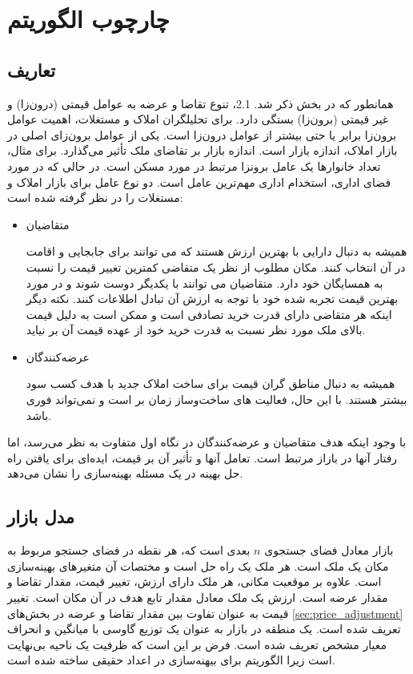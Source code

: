 \section{چارچوب الگوریتم }

\subsection{تعاریف}
همانطور که در بخش ذکر شد. 2.1، تنوع تقاضا و عرضه به عوامل قیمتی (درون‌زا) و غیر قیمتی (برون‌زا) بستگی دارد. برای تحلیلگران املاک و مستغلات، اهمیت عوامل برون‌زا  برابر یا حتی بیشتر از عوامل درون‌زا است.  یکی از عوامل برون‌زای اصلی در بازار املاک، اندازه بازار است. اندازه بازار بر تقاضای ملک تأثیر می‌گذارد. برای مثال، تعداد خانوارها یک عامل برونزا مرتبط در مورد مسکن است. در حالی که در مورد فضای اداری، استخدام اداری مهم‌ترین عامل است. دو نوع عامل برای بازار املاک و مستغلات را در نظر گرفته شده است:
\begin{itemize}
	\item متقاضیان
	
	 همیشه به دنبال دارایی با بهترین ارزش هستند که می توانند برای جابجایی و اقامت در آن انتخاب کنند. مکان مطلوب از نظر یک متقاضی کمترین تغییر قیمت را نسبت به همسایگان خود دارد. متقاضیان می توانند با یکدیگر دوست شوند و در مورد بهترین قیمت تجربه شده خود با توجه به ارزش آن تبادل اطلاعات کنند. نکته دیگر اینکه هر متقاضی دارای قدرت خرید تصادفی است و ممکن است به دلیل قیمت بالای ملک مورد نظر نسبت به قدرت خرید خود از عهده قیمت آن بر نیاید.
	\item  ‌عرضه‌کنندگان
	
	 همیشه به دنبال مناطق گران قیمت برای ساخت املاک جدید با هدف کسب سود بیشتر هستند. با این حال، فعالیت های ساخت‌و‌ساز زمان بر است و نمی‌تواند فوری باشد.
	
\end{itemize}

با وجود اینکه هدف متقاضیان و ‌عرضه‌کنندگان در نگاه اول متفاوت به نظر می‌رسد، اما رفتار آنها در بازاز مرتبط است. تعامل آنها و تأثیر آن بر قیمت، ایده‌ای برای یافتن راه حل بهینه در یک مسئله بهینه‌سازی را نشان می‌دهد.


\subsection{مدل بازار}
بازار معادل فضای جستجوی $n$ بعدی است که، هر نقطه در فضای جستجو مربوط به مکان یک ملک است. هر ملک یک راه حل است و مختصات آن متغیرهای بهینه‌سازی است. علاوه بر موقعیت مکانی، هر ملک دارای ارزش، تغییر قیمت، مقدار تقاضا و مقدار عرضه است. ارزش یک ملک معادل مقدار تابع هدف در آن مکان است. تغییر قیمت به عنوان تفاوت بین مقدار تقاضا و عرضه در بخش‌های \ref{sec:price_adjustment} تعریف شده است. یک منطقه در بازار به عنوان یک توزیع گاوسی با میانگین و انحراف معیار مشخص تعریف شده است. فرض بر این است که ظرفیت یک ناحیه بی‌نهایت است زیرا الگوریتم برای بیهنه‌سازی در اعداد حقیقی ساخته شده است.

